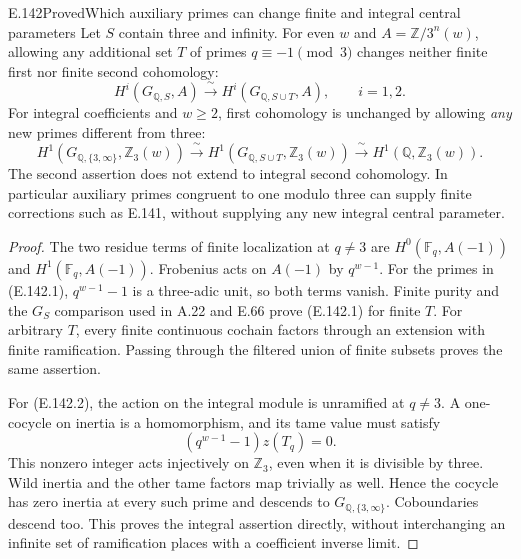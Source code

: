 \begin{result}{E.142}{Proved}{Which auxiliary primes can change finite and integral central parameters}
Let \(S\) contain three and infinity. For even \(w\)
and \(A=\mathbb Z/3^n(w)\), allowing any additional
set \(T\) of primes \(q\equiv-1\pmod3\) changes neither
finite first nor finite second cohomology:
\[
 H^i(G_{\mathbb Q,S},A)
       \xrightarrow{\ \sim\ }
 H^i(G_{\mathbb Q,S\cup T},A),
                         \qquad i=1,2.
 \tag{E.142.1}
\]
For integral coefficients and \(w\ge2\), first
cohomology is unchanged by allowing \emph{any}
new primes different from three:
\[
 H^1(G_{\mathbb Q,\{3,\infty\}},\mathbb Z_3(w))
       \xrightarrow{\ \sim\ }
 H^1(G_{\mathbb Q,S\cup T},\mathbb Z_3(w))
       \xrightarrow{\ \sim\ }
 H^1(\mathbb Q,\mathbb Z_3(w)).
 \tag{E.142.2}
\]
The second assertion does not extend to integral
second cohomology. In particular auxiliary primes
congruent to one modulo three can supply finite
corrections such as E.141, without supplying any
new integral central parameter.
\end{result}
\begin{proof}
The two residue terms of finite localization at
\(q\ne3\) are
\(H^0(\mathbb F_q,A(-1))\) and
\(H^1(\mathbb F_q,A(-1))\).
Frobenius acts on \(A(-1)\) by \(q^{w-1}\).
For the primes in (E.142.1),
\(q^{w-1}-1\) is a three-adic unit, so both terms
vanish. Finite purity and the \(G_S\) comparison
used in A.22 and E.66 prove (E.142.1) for finite
\(T\). For arbitrary \(T\), every finite continuous
cochain factors through an extension with finite
ramification. Passing through the filtered union
of finite subsets proves the same assertion.

For (E.142.2), the action on the integral module
is unramified at \(q\ne3\). A one-cocycle on
inertia is a homomorphism, and its tame value
must satisfy
\[
                    (q^{w-1}-1)z(T_q)=0 .
\]
This nonzero integer acts injectively on
\(\mathbb Z_3\), even when it is divisible by
three. Wild inertia and the other tame factors
map trivially as well. Hence the cocycle has zero
inertia at every such prime and descends to
\(G_{\mathbb Q,\{3,\infty\}}\).
Coboundaries descend too. This proves the
integral assertion directly, without interchanging
an infinite set of ramification places with a
coefficient inverse limit.
\end{proof}

